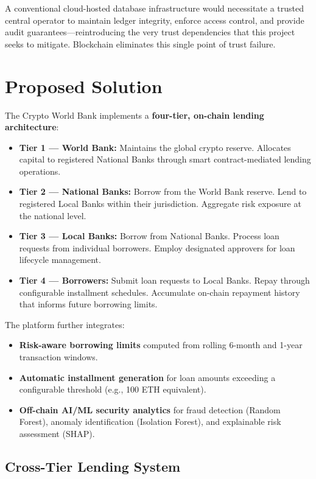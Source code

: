 \documentclass[12pt,a4paper]{report}
\begin{document}
A conventional cloud-hosted database infrastructure would necessitate a trusted central operator to maintain ledger integrity, enforce access control, and provide audit guarantees---reintroducing the very trust dependencies that this project seeks to mitigate. Blockchain eliminates this single point of trust failure.

\section{Proposed Solution}

The Crypto World Bank implements a \textbf{four-tier, on-chain lending architecture}:

\begin{itemize}[noitemsep]
\item \textbf{Tier 1 --- World Bank:} Maintains the global crypto reserve. Allocates capital to registered National Banks through smart contract-mediated lending operations.
\item \textbf{Tier 2 --- National Banks:} Borrow from the World Bank reserve. Lend to registered Local Banks within their jurisdiction. Aggregate risk exposure at the national level.
\item \textbf{Tier 3 --- Local Banks:} Borrow from National Banks. Process loan requests from individual borrowers. Employ designated approvers for loan lifecycle management.
\item \textbf{Tier 4 --- Borrowers:} Submit loan requests to Local Banks. Repay through configurable installment schedules. Accumulate on-chain repayment history that informs future borrowing limits.
\end{itemize}

The platform further integrates:

\begin{itemize}[noitemsep]
\item \textbf{Risk-aware borrowing limits} computed from rolling 6-month and 1-year transaction windows.
\item \textbf{Automatic installment generation} for loan amounts exceeding a configurable threshold (e.g., 100 ETH equivalent).
\item \textbf{Off-chain AI/ML security analytics} for fraud detection (Random Forest), anomaly identification (Isolation Forest), and explainable risk assessment (SHAP).
\end{itemize}

\subsection{Cross-Tier Lending System}
\end{document}
